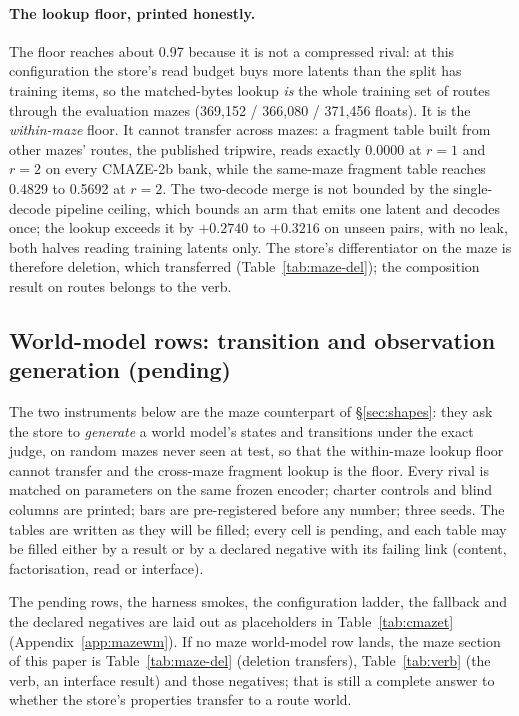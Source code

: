 \documentclass{article}
\begin{document}
\paragraph{The lookup floor, printed honestly.} The floor reaches about 0.97 because it is not a
compressed rival: at this configuration the store's read budget buys more latents than the split
has training items, so the matched-bytes lookup \emph{is} the whole training set of routes
through the evaluation mazes (369,152 / 366,080 / 371,456 floats).
It is the \emph{within-maze} floor. It cannot transfer across mazes: a fragment table built from
other mazes' routes, the published tripwire, reads exactly 0.0000 at $r=1$ and $r=2$ on every
CMAZE-2b bank, while the same-maze fragment table reaches 0.4829 to 0.5692 at $r=2$.
The two-decode merge is not bounded by the single-decode pipeline ceiling, which bounds an arm
that emits one latent and decodes once; the lookup exceeds it by $+0.2740$ to $+0.3216$ on
unseen pairs, with no leak, both halves reading training latents only.
The store's differentiator on the maze is therefore deletion, which transferred
(Table~\ref{tab:maze-del}); the composition result on routes belongs to the verb.

\subsection{World-model rows: transition and observation generation (pending)}
\label{sec:maze-wm}

The two instruments below are the maze counterpart of \S\ref{sec:shapes}: they ask the store to
\emph{generate} a world model's states and transitions under the exact judge, on random mazes
never seen at test, so that the within-maze lookup floor cannot transfer and the cross-maze
fragment lookup is the floor. Every rival is matched on parameters on the same frozen encoder;
charter controls and blind columns are printed; bars are pre-registered before any number;
three seeds. The tables are written as they will be filled; every cell is pending, and each
table may be filled either by a result or by a declared negative with its failing link
(content, factorisation, read or interface).

The pending rows, the harness smokes, the configuration ladder, the fallback and the declared
negatives are laid out as placeholders in Table~\ref{tab:cmazet} (Appendix~\ref{app:mazewm}).
If no maze world-model row lands, the maze section of this paper is Table~\ref{tab:maze-del}
(deletion transfers), Table~\ref{tab:verb} (the verb, an interface result) and those negatives;
that is still a complete answer to whether the store's properties transfer to a route world.
\end{document}
